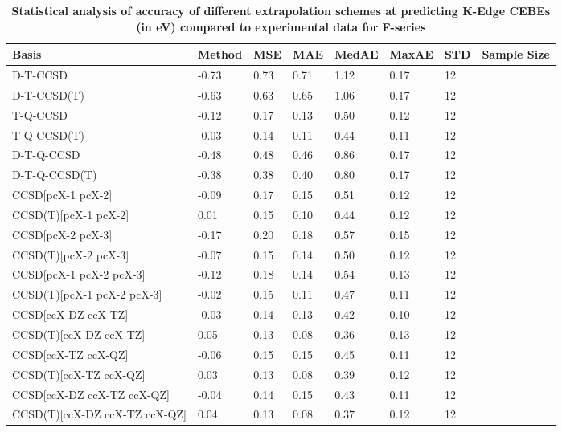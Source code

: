\begin{table}
  \caption{\textbf{Statistical analysis of accuracy of different extrapolation schemes at predicting K-Edge CEBEs (in eV) compared to experimental data for F-series}}
  \label{tbl:extrap-scheme-summary-f}
  \begin{tabular}{l l l l l l l l }
    \toprule
    \textbf{Basis} & \textbf{Method} & \textbf{MSE} & \textbf{MAE} & \textbf{MedAE} & \textbf{MaxAE} & \textbf{STD} & \textbf{Sample Size} \\ 
    \midrule
    D-T-CCSD & -0.73 & 0.73 & 0.71 & 1.12 & 0.17 & 12 \\ 
    D-T-CCSD(T) & -0.63 & 0.63 & 0.65 & 1.06 & 0.17 & 12 \\ 
    T-Q-CCSD & -0.12 & 0.17 & 0.13 & 0.50 & 0.12 & 12 \\ 
    T-Q-CCSD(T) & -0.03 & 0.14 & 0.11 & 0.44 & 0.11 & 12 \\ 
    D-T-Q-CCSD & -0.48 & 0.48 & 0.46 & 0.86 & 0.17 & 12 \\ 
    D-T-Q-CCSD(T) & -0.38 & 0.38 & 0.40 & 0.80 & 0.17 & 12 \\ 
    CCSD[pcX-1 pcX-2] & -0.09 & 0.17 & 0.15 & 0.51 & 0.12 & 12 \\ 
    CCSD(T)[pcX-1 pcX-2] & 0.01 & 0.15 & 0.10 & 0.44 & 0.12 & 12 \\ 
    CCSD[pcX-2 pcX-3] & -0.17 & 0.20 & 0.18 & 0.57 & 0.15 & 12 \\ 
    CCSD(T)[pcX-2 pcX-3] & -0.07 & 0.15 & 0.14 & 0.50 & 0.12 & 12 \\ 
    CCSD[pcX-1 pcX-2 pcX-3] & -0.12 & 0.18 & 0.14 & 0.54 & 0.13 & 12 \\ 
    CCSD(T)[pcX-1 pcX-2 pcX-3] & -0.02 & 0.15 & 0.11 & 0.47 & 0.11 & 12 \\ 
    CCSD[ccX-DZ ccX-TZ] & -0.03 & 0.14 & 0.13 & 0.42 & 0.10 & 12 \\ 
    CCSD(T)[ccX-DZ ccX-TZ] & 0.05 & 0.13 & 0.08 & 0.36 & 0.13 & 12 \\ 
    CCSD[ccX-TZ ccX-QZ] & -0.06 & 0.15 & 0.15 & 0.45 & 0.11 & 12 \\ 
    CCSD(T)[ccX-TZ ccX-QZ] & 0.03 & 0.13 & 0.08 & 0.39 & 0.12 & 12 \\ 
    CCSD[ccX-DZ ccX-TZ ccX-QZ] & -0.04 & 0.14 & 0.15 & 0.43 & 0.11 & 12 \\ 
    CCSD(T)[ccX-DZ ccX-TZ ccX-QZ] & 0.04 & 0.13 & 0.08 & 0.37 & 0.12 & 12 \\ 
    \bottomrule
  \end{tabular}
\end{table}

